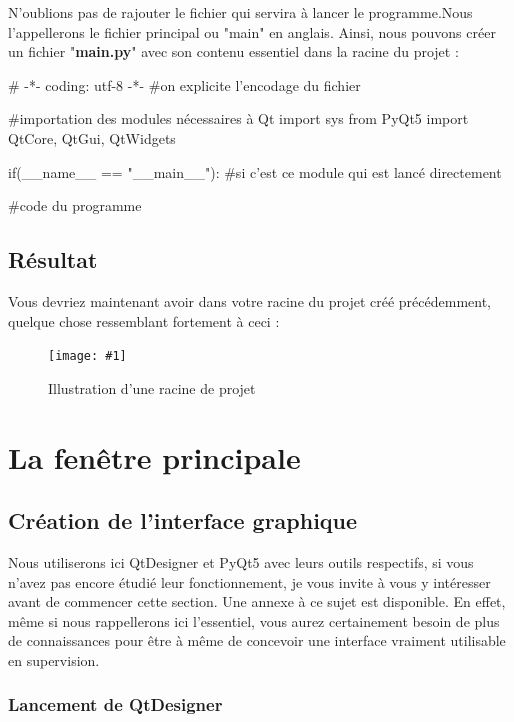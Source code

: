 \documentclass[12pt]{report}    %
\newcommand{\iImage}[3]{\begin{figure}[H]\centering\texttt{[image: \#1]}\caption{#2}\end{figure}}
\newcommand{\bold}[1]{{\bfseries #1}}
\newcommand{\rootIm}{images/ENIBSupervision/}
\begin{document}
N'oublions pas de rajouter le fichier qui servira à lancer le programme.Nous l'appellerons le fichier principal ou "main" en anglais.\newline
Ainsi, nous pouvons créer un fichier "\bold{main.py}" avec son contenu essentiel dans la racine du projet :

\begin{pyCode}
# -*- coding: utf-8 -*-
#on explicite l'encodage du fichier

#importation des modules nécessaires à Qt
import sys
from PyQt5 import QtCore, QtGui, QtWidgets


if(__name__ == "__main__"): #si c'est ce module qui est lancé directement

	#code du programme

\end{pyCode}

\subsection{Résultat}

Vous devriez maintenant avoir dans votre racine du projet créé précédemment, quelque chose ressemblant fortement à ceci :

\iImage{\rootIm enibSup_window_explorer_projectRoot.png}{Illustration d'une racine de projet}{0.4}


\section{La fenêtre principale}

\subsection{Création de l'interface graphique}

Nous utiliserons ici QtDesigner et PyQt5 avec leurs outils respectifs, si vous n'avez pas encore étudié leur fonctionnement, je vous invite à vous y intéresser avant de commencer cette section. Une annexe à ce sujet est disponible.\newline
En effet, même si nous rappellerons ici l'essentiel, vous aurez certainement besoin de plus de connaissances pour être à même de concevoir une interface vraiment utilisable en supervision.

\subsubsection{Lancement de QtDesigner}
\end{document}

